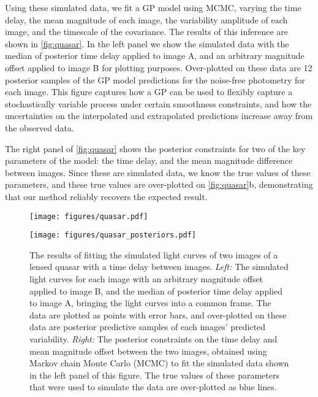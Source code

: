 \documentclass[letterpaper]{ar-1col}
\begin{document}
Using these simulated data, we fit a GP model using MCMC, varying the time delay, the mean magnitude of each image, the variability amplitude of each image, and the timescale of the covariance.
The results of this inference are shown in \autoref{fig:quasar}.
In the left panel we show the simulated data with the median of posterior time delay applied to image A, and an arbitrary magnitude offset applied to image B for plotting purposes.
Over-plotted on these data are 12 posterior samples of the GP model predictions for the noise-free photometry for each image.
This figure captures how a GP can be used to flexibly capture a stochastically variable process under certain smoothness constraints, and how the uncertainties on the interpolated and extrapolated predictions increase away from the observed data.

The right panel of \autoref{fig:quasar} shows the posterior constraints for two of the key parameters of the model: the time delay, and the mean magnitude difference between images.
Since these are simulated data, we know the true values of these parameters, and these true values are over-plotted on \autoref{fig:quasar}b, demonstrating that our method reliably recovers the expected result.

\begin{figure}[ht]
  \centering
  \begin{minipage}[t]{0.5\linewidth}
    \texttt{[image: figures/quasar.pdf]}
  \end{minipage} \hfill
  \begin{minipage}[t]{0.44\linewidth}
    \texttt{[image: figures/quasar\_posteriors.pdf]}
  \end{minipage}
  \caption{The results of fitting the simulated light curves of two images of a lensed quasar with a time delay between images.
  \emph{Left:} The simulated light curves for each image with an arbitrary magnitude offset applied to image B, and the median of posterior time delay applied to image A, bringing the light curves into a common frame.
  The data are plotted as points with error bars, and over-plotted on these data are posterior predictive samples of each images' predicted variability.
  \emph{Right:} The posterior constraints on the time delay and mean magnitude offset between the two images, obtained using Markov chain Monte Carlo (MCMC) to fit the simulated data shown in the left panel of this figure.
  The true values of these parameters that were used to simulate the data are over-plotted as blue lines.}
  \label{fig:quasar}
\end{figure}
\end{document}
